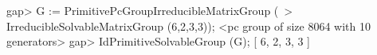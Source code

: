 \beginexample
gap> G := PrimitivePcGroupIrreducibleMatrixGroup (\
>             IrreducibleSolvableMatrixGroup (6,2,3,3));
<pc group of size 8064 with 10 generators>
gap> IdPrimitiveSolvableGroup (G);
[ 6, 2, 3, 3 ]
\endexample


